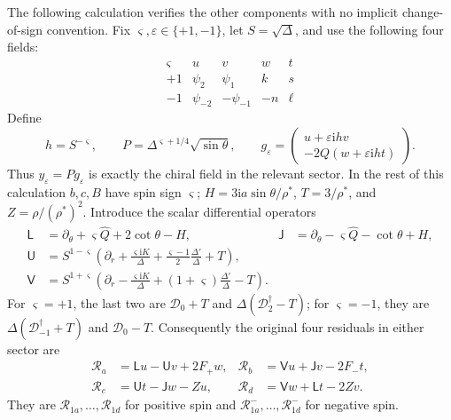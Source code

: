 \documentclass[11pt,a4paper]{article}
\numberwithin{equation}{section}
\theoremstyle{definition}
\theoremstyle{remark}
\newcommand{\I}{\mathrm i}
\newcommand{\D}{\mathcal D}
\newcommand{\Res}{\mathcal R}
\newcommand{\mat}[1]{\begin{pmatrix}#1\end{pmatrix}}
\begin{document}
The following calculation verifies the other components with no implicit
change-of-sign convention.  Fix
\(\varsigma,\varepsilon\in\{+1,-1\}\), let \(S=\sqrt\Delta\), and use
the following four fields:
\[
\begin{array}{c|cccc}
 \varsigma & u&v&w&t\\ \hline
 +1&\psi_2&\psi_1&k&s\\
 -1&\psi_{-2}&-\psi_{-1}&-n&\ell
\end{array}
\]
Define
\[
 h=S^{-\varsigma},\qquad
 P=\Delta^{\varsigma+1/4}\sqrt{\sin\theta},\qquad
 g_\varepsilon=\mat{u+\varepsilon\I h v\\
                         -2Q(w+\varepsilon\I h t)}.
\]
Thus \(y_\varepsilon=Pg_\varepsilon\) is exactly the chiral field in
the relevant sector.  In the rest of this calculation \(b,c,B\) have
spin sign \(\varsigma\); \(H=3\I a\sin\theta/\rho^*\),
\(T=3/\rho^*\), and \(Z=\rho/(\rho^*)^2\).
Introduce the scalar differential operators
\begin{align}
 \mathsf L&=\partial_\theta+\varsigma\widehat Q+2\cot\theta-H,
 &\mathsf J&=\partial_\theta-\varsigma\widehat Q-\cot\theta+H,
 \label{eq:uniform-angular}\\
 \mathsf U&=S^{1-\varsigma}
 \left(\partial_r+\frac{\varsigma\I K}{\Delta}
                 +\frac{\varsigma-1}{2}\frac{\Delta'}{\Delta}+T\right),
 \label{eq:uniform-U}\\
 \mathsf V&=S^{1+\varsigma}
 \left(\partial_r-\frac{\varsigma\I K}{\Delta}
                 +(1+\varsigma)\frac{\Delta'}{\Delta}-T\right).
 \label{eq:uniform-V}
\end{align}
For \(\varsigma=+1\), the last two are
\(\D_0+T\) and \(\Delta(\D_2^\dagger-T)\); for
\(\varsigma=-1\), they are
\(\Delta(\D_{-1}^\dagger+T)\) and \(\D_0-T\).
Consequently the original four residuals in either sector are
\begin{align}
 \Res_a&=\mathsf L u-\mathsf U v+2F_+w,
 &\Res_b&=\mathsf V u+\mathsf J v-2F_-t,\nonumber\\
 \Res_c&=\mathsf U t-\mathsf J w-Zu,
 &\Res_d&=\mathsf V w+\mathsf L t-2Zv.
 \label{eq:uniform-original}
\end{align}
They are \(\Res_{1a},\ldots,\Res_{1d}\) for positive spin and
\(\Res^-_{1a},\ldots,\Res^-_{1d}\) for negative spin.
\end{document}
